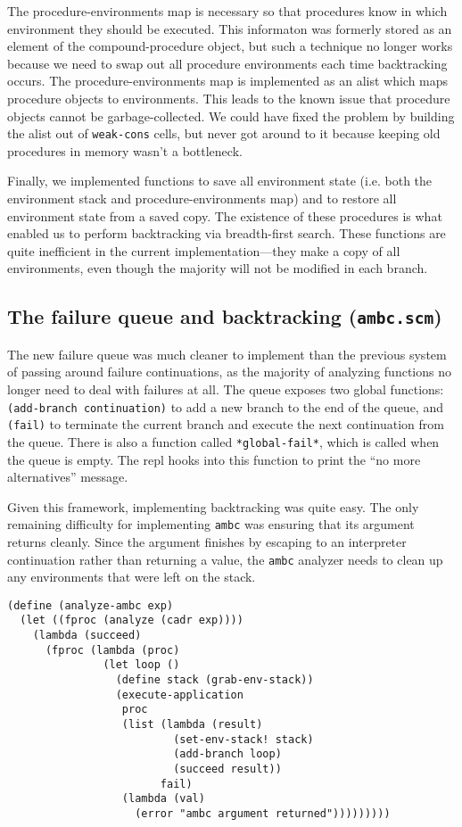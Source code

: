 \documentclass{article}
\begin{document}
The procedure-environments map is necessary so that procedures know in
which environment they should be executed.  This informaton was
formerly stored as an element of the compound-procedure object, but
such a technique no longer works because we need to swap out all
procedure environments each time backtracking occurs.  The
procedure-environments map is implemented as an alist which maps
procedure objects to environments.  This leads to the known issue that
procedure objects cannot be garbage-collected. We could have fixed the
problem by building the alist out of \texttt{weak-cons} cells, but
never got around to it because keeping old procedures in memory wasn't
a bottleneck.

Finally, we implemented functions to save all environment state
(i.e. both the environment stack and procedure-environments map) and
to restore all environment state from a saved copy.  The existence of
these procedures is what enabled us to perform backtracking via
breadth-first search.  These functions are quite inefficient in the
current implementation---they make a copy of all environments, even
though the majority will not be modified in each branch.

\subsection{The failure queue and backtracking (\texttt{ambc.scm})}

The new failure queue was much cleaner to implement than the previous
system of passing around failure continuations, as the majority of
analyzing functions no longer need to deal with failures at all.  The
queue exposes two global functions: \texttt{(add-branch continuation)}
to add a new branch to the end of the queue, and \texttt{(fail)} to
terminate the current branch and execute the next continuation from
the queue.  There is also a function called \texttt{*global-fail*},
which is called when the queue is empty. The repl hooks into this
function to print the ``no more alternatives'' message.

Given this framework, implementing backtracking was quite easy.  The
only remaining difficulty for implementing \texttt{ambc} was ensuring
that its argument returns cleanly.  Since the argument finishes by
escaping to an interpreter continuation rather than returning a value,
the \texttt{ambc} analyzer needs to clean up any environments that
were left on the stack.

\begin{lstlisting}
(define (analyze-ambc exp)
  (let ((fproc (analyze (cadr exp))))
    (lambda (succeed)
      (fproc (lambda (proc)
               (let loop ()
                 (define stack (grab-env-stack))
                 (execute-application
                  proc
                  (list (lambda (result)
                          (set-env-stack! stack)
                          (add-branch loop)
                          (succeed result))
                        fail)
                  (lambda (val)
                    (error "ambc argument returned")))))))))
\end{lstlisting}
\end{document}
